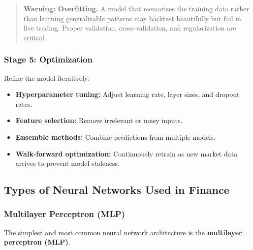 \documentclass[12pt,openany]{book}
\begin{document}
\begin{quote}
\textbf{Warning: Overfitting.} A model that memorizes the training data rather than learning generalizable patterns may backtest beautifully but fail in live trading. Proper validation, cross-validation, and regularization are critical.
\end{quote}

\subsubsection{Stage 5: Optimization}

Refine the model iteratively:
\begin{itemize}[leftmargin=*]
    \item \textbf{Hyperparameter tuning:} Adjust learning rate, layer sizes, and dropout rates.
    \item \textbf{Feature selection:} Remove irrelevant or noisy inputs.
    \item \textbf{Ensemble methods:} Combine predictions from multiple models.
    \item \textbf{Walk-forward optimization:} Continuously retrain as new market data arrives to prevent model staleness.
\end{itemize}

\subsection{Types of Neural Networks Used in Finance}

\subsubsection{Multilayer Perceptron (MLP)}

The simplest and most common neural network architecture is the \textbf{multilayer perceptron (MLP)}.

\begin{center}
\end{center}
\end{document}
